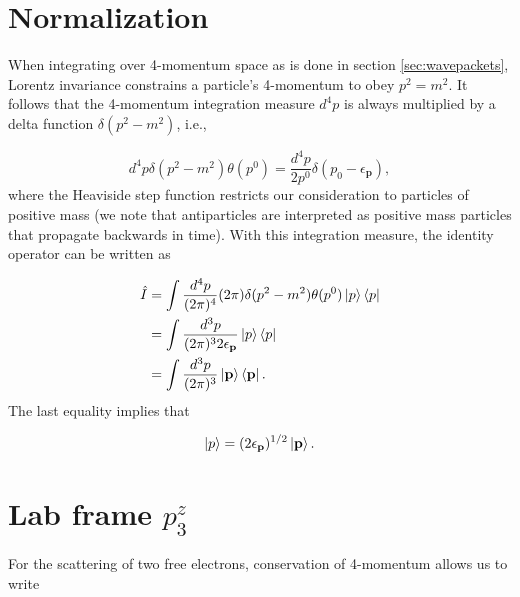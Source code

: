 \documentclass{article}
\begin{document}
\section{Normalization}
\label{app:normalization}

When integrating over 4-momentum space as is done in section
\ref{sec:wavepackets}, Lorentz invariance constrains a particle's 4-momentum to
obey $p^2 = m^2$.
It follows that the 4-momentum integration measure $d^4p$ is always multiplied
by a delta function $\delta(p^2-m^2)$, i.e.,

\begin{equation}
    d^4p\delta(p^2 - m^2)\theta(p^0)
    =
    \frac{d^4p}{2p^0}\delta(p_0 - \epsilon_\mathbf{p}),
\end{equation}
%
where the Heaviside step function restricts our consideration to particles of
positive mass (we note that antiparticles are interpreted as positive mass
particles that propagate backwards in time).  With this integration measure,
the identity operator can be written as

\begin{equation}
\label{eq:identity}
\begin{aligned}
    \hat{I}
    &=
    \int \frac{d^4p}{(2\pi)^4}(2\pi)\delta(p^2 - m^2)\theta(p^0)
    \ket{p}\bra{p}
    \\&=
    \int \frac{d^3p}{(2\pi)^3 2\epsilon_\mathbf{p}}
    \ket{p}\bra{p}
    \\&=
    \int \frac{d^3p}{(2\pi)^3}
    \ket{\mathbf{p}}\bra{\mathbf{p}}.
\end{aligned}
\end{equation}
%
The last equality implies that

\begin{equation}
\label{eq:normalization}
    \ket{p} = (2\epsilon_\mathbf{p})^{1/2}\ket{\mathbf{p}}.
\end{equation}


\pagebreak
\section{Lab frame $p^z_3$}
\label{app:p3z}

For the scattering of two free electrons, conservation of 4-momentum allows us
to write
\end{document}

